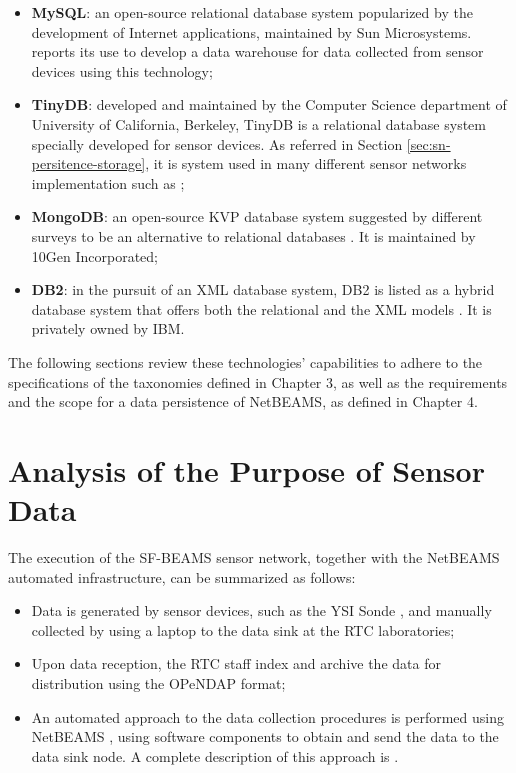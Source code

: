 \begin{itemize}
  \item \textbf{MySQL}\cite{mysql}: an open-source relational database
  system popularized by the development of Internet applications, maintained
  by Sun Microsystems. \cite{sn-dataware-house} reports its use to develop a
  data warehouse for data collected from sensor devices using this technology;
  \item \textbf{TinyDB}\cite{tinydb}: developed and maintained by the Computer
  Science department of University of California, Berkeley, TinyDB is a
  relational database system specially developed for sensor devices. As
  referred in Section \ref{sec:sn-persitence-storage}, it is system used in
  many different sensor networks implementation such as \cite{sn-db-tinydb,
  sn-db-newop};
  \item \textbf{MongoDB}\cite{mongodb}: an open-source KVP database
  system suggested by different surveys to be an alternative to relational
  databases \cite{db-is-rdbs-dommed, cloud-comp-architectures}. It is maintained
  by 10Gen Incorporated;
  \item \textbf{DB2}\cite{db2}: in the pursuit of an XML database system, DB2
  is listed as a hybrid database system that offers both the relational and the
  XML models \cite{db-xml-enabled}. It is privately owned by IBM.
\end{itemize}

The following sections review these technologies' capabilities to adhere to
the specifications of the taxonomies defined in Chapter 3, as well as the
requirements and the scope for a data persistence of NetBEAMS, as defined in
Chapter 4.

\section{Analysis of the Purpose of Sensor Data}

The execution of the SF-BEAMS sensor network, together with the NetBEAMS
automated infrastructure, can be summarized as follows:

\begin{itemize}
  \item Data is generated by sensor devices, such as the YSI Sonde
  \cite{YSI-Sonde}, and manually collected by using a laptop to the data sink
  at the RTC laboratories;
  \item Upon data reception, the RTC staff index and archive the data for
  distribution using the OPeNDAP format;
  \item An automated approach to the data collection procedures is performed 
  using NetBEAMS \cite{netbeams2009}, using software components to obtain and
  send the data to the data sink node. A complete description of this approach
  is \cite{netbeams-dsp-architecture}.
\end{itemize}

